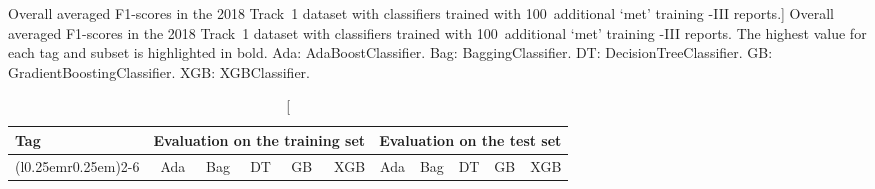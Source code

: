 \begingroup

\setlength\tabcolsep{4.2pt}

\newcommand{\minorfootnotesize}{\fontsize{9.4pt}{11.28pt}\selectfont}

\begin{table}[!t]

\caption%
[Overall averaged F1-scores in the 2018  Track~1 dataset with classifiers trained with 100~additional `met' training -III reports.]%
{Overall averaged F1-scores in the 2018  Track~1 dataset with classifiers trained with 100~additional `met' training -III reports. The highest value for each tag and subset is highlighted in bold. Ada: \textsf{AdaBoostClassifier}. Bag: \textsf{BaggingClassifier}. DT: \textsf{DecisionTreeClassifier}. GB: \textsf{GradientBoostingClassifier}. XGB: \textsf{XGBClassifier}.}
\label{tab:2018-n2c2-results-mimic100p}

\centering

\minorfootnotesize

\begin{tabular}{lrrrrrrrrrr}

\toprule

Tag & \multicolumn{5}{l}{Evaluation on the training set} & \multicolumn{5}{l}{Evaluation on the test set}\\

\cmidrule(r{0.25em}){1-1}\cmidrule(l{0.25em}r{0.25em}){2-6}\cmidrule(l{0.25em}){7-11}

& Ada & Bag & DT & GB & XGB & Ada & Bag & DT & GB & XGB\\



\end{tabular}
\end{table}
